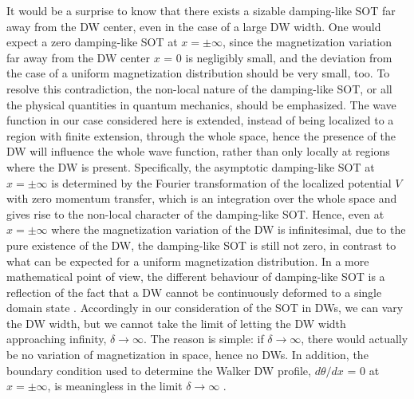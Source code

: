 \documentclass[12pt]{iopart}
\begin{document}
It would be a surprise to know that there exists a sizable damping-like SOT far away from the DW center, even in the case of a large DW width. One would expect a zero damping-like SOT at $x = \pm \infty$, since the magnetization variation far away from the DW center $x$ = 0 is negligibly small, and the deviation from the case of a uniform magnetization distribution should be very small, too. To resolve this contradiction, the non-local nature of the damping-like SOT, or all the physical quantities in quantum mechanics, should be emphasized. The wave function in our case considered here is extended, instead of being localized to a region with finite extension, through the whole space, hence the presence of the DW will influence the whole wave function, rather than only locally at regions where the DW is present. Specifically, the asymptotic damping-like SOT at $x = \pm \infty$ is determined by the Fourier transformation of the localized potential $V$ with zero momentum transfer, which is an integration over the whole space and gives rise to the non-local character of the damping-like SOT. Hence, even at $x = \pm \infty$ where the magnetization variation of the DW is infinitesimal, due to the pure existence of the DW, the damping-like SOT is still not zero, in contrast to what can be expected for a uniform magnetization distribution. In a more mathematical point of view, the different behaviour of damping-like SOT is a reflection of the fact that a DW cannot be continuously deformed to a single domain state \cite{Braun}. Accordingly in our consideration of the SOT in DWs, we can vary the DW width, but we cannot take the limit of letting the DW width approaching infinity, $\delta \rightarrow \infty$. The reason is simple: if $\delta \rightarrow \infty$, there would actually be no variation of magnetization in space, hence no DWs. In addition, the boundary condition used to determine the Walker DW profile, $d \theta / dx$ = 0 at $x = \pm \infty$, is meaningless in the limit $\delta \rightarrow \infty$ .
\end{document}
